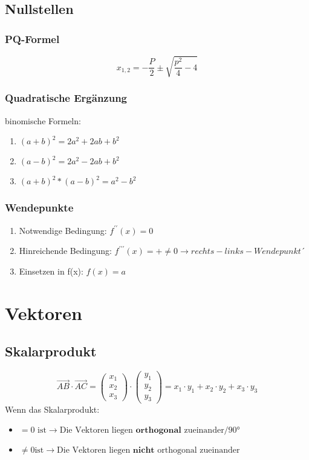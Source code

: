\documentclass[a4paper,12pt]{article}
\begin{document}
	\subsection*{Nullstellen}
		\subsubsection*{PQ-Formel}
			$$
x_{1, 2} = - \frac{P}{2} \pm \sqrt{\frac{p^{2}}{4}-4}
			$$
		\subsubsection*{Quadratische Ergänzung}
			binomische Formeln:
				\begin{enumerate}
					\item $(a+b)^{2} = 2a^{2}+2ab+b^{2}$
					\item $(a-b)^{2} = 2a^{2}-2ab+b^{2}$
					\item $(a+b)^{2}*(a-b)^{2}  = a^{2}-b^{2}$
				\end{enumerate}
		\subsubsection*{Wendepunkte}
			\begin{enumerate}
				\item Notwendige Bedingung: $f^{\prime\prime}(x)=0$
				\item Hinreichende Bedingung: $f^{\prime\prime\prime}(x)=+\neq0 \rightarrow rechts-links-Wendepunkt´$
				\item Einsetzen in f(x): $f(x)=a$
			\end{enumerate}
\section*{Vektoren}
	\subsection*{Skalarprodukt}
		$$
		\vec{AB} \cdot \vec{AC} = 
		\begin{pmatrix} 
			x_{1} \\
			x_{2} \\
			x_{3} 
		\end{pmatrix}
		\cdot 
		\begin{pmatrix} 
			y_{1} \\
			y_{2} \\
			y_{3}
		\end{pmatrix} = x_{1} \cdot y_{1}+x_{2} \cdot y_{2}+x_{3} \cdot y_{3}
		$$
		Wenn das Skalarprodukt:
			\begin{itemize}
				\item $=0 \text{ ist} \rightarrow \text{Die Vektoren liegen } \textbf{orthogonal } \text{zueinander/90°}$
				\item $\neq 0 \text{ist} \rightarrow \text{Die Vektoren liegen } \textbf{nicht } \text{orthogonal zueinander}$
			\end{itemize}
\end{document}
